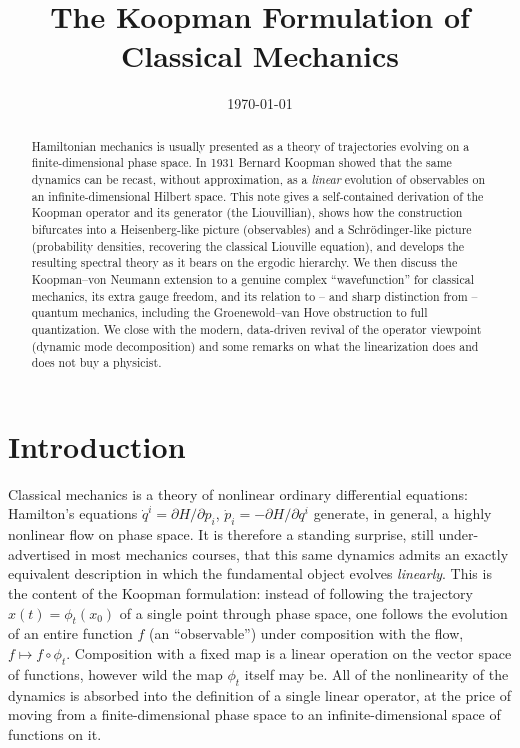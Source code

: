 \documentclass[11pt]{article}
\title{The Koopman Formulation of Classical Mechanics}
\author{}
\date{\today}
\theoremstyle{remark}
\begin{document}
\maketitle

\begin{abstract}
\noindent
Hamiltonian mechanics is usually presented as a theory of trajectories evolving on a finite-dimensional phase space. In 1931 Bernard Koopman showed that the same dynamics can be recast, without approximation, as a \emph{linear} evolution of observables on an infinite-dimensional Hilbert space. This note gives a self-contained derivation of the Koopman operator and its generator (the Liouvillian), shows how the construction bifurcates into a Heisenberg-like picture (observables) and a Schr\"odinger-like picture (probability densities, recovering the classical Liouville equation), and develops the resulting spectral theory as it bears on the ergodic hierarchy. We then discuss the Koopman--von Neumann extension to a genuine complex ``wavefunction'' for classical mechanics, its extra gauge freedom, and its relation to -- and sharp distinction from -- quantum mechanics, including the Groenewold--van Hove obstruction to full quantization. We close with the modern, data-driven revival of the operator viewpoint (dynamic mode decomposition) and some remarks on what the linearization does and does not buy a physicist.
\end{abstract}

\tableofcontents

\section{Introduction}

Classical mechanics is a theory of nonlinear ordinary differential equations: Hamilton's equations $\dot q^i = \partial H/\partial p_i$, $\dot p_i = -\partial H/\partial q^i$ generate, in general, a highly nonlinear flow on phase space. It is therefore a standing surprise, still under-advertised in most mechanics courses, that this same dynamics admits an exactly equivalent description in which the fundamental object evolves \emph{linearly}. This is the content of the Koopman formulation: instead of following the trajectory $x(t)=\phi_t(x_0)$ of a single point through phase space, one follows the evolution of an entire function $f$ (an ``observable'') under composition with the flow, $f \mapsto f\circ\phi_t$. Composition with a fixed map is a linear operation on the vector space of functions, however wild the map $\phi_t$ itself may be. All of the nonlinearity of the dynamics is absorbed into the definition of a single linear operator, at the price of moving from a finite-dimensional phase space to an infinite-dimensional space of functions on it.
\end{document}
